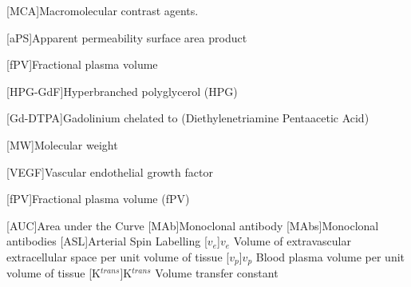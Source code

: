 \begin{acronym}
[MCA]{Macromolecular contrast agents.}

[aPS]{Apparent permeability surface area product}%

[fPV]{Fractional plasma volume}

[HPG-GdF]{Hyperbranched polyglycerol (HPG)}%

[Gd-DTPA]{Gadolinium chelated to (Diethylenetriamine Pentaacetic Acid)}%

[MW]{Molecular weight}

[VEGF]{Vascular endothelial growth factor}

[fPV]{Fractional plasma volume (fPV)}

[AUC]{Area under the Curve}%
[MAb]{Monoclonal antibody}
[MAbs]{Monoclonal antibodies}
[ASL]{Arterial Spin Labelling}
[$v_e$]{$v_e$ Volume of extravascular extracellular space per unit volume of tissue}
[$v_p$]{$v_p$ Blood plasma volume per unit volume of tissue}
[K$^{trans}$]{K$^{trans}$ Volume transfer constant}
\end{acronym}

% 
